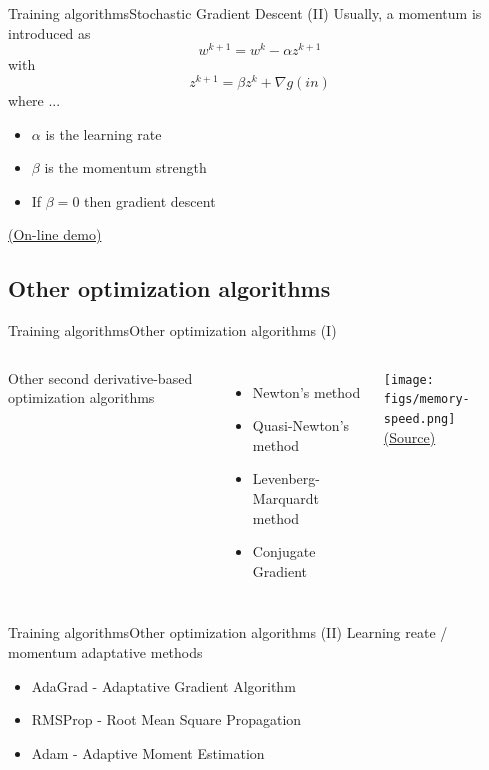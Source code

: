 \documentclass[10pt,compress]{beamer} %
\begin{document}
\begin{frame}{Training algorithms}{Stochastic Gradient Descent (II)}
    Usually, a \alert{momentum} is introduced as
	\begin{equation*}
	w^{k+1} = w^k - \alpha z^{k+1}
        \end{equation*}
with
	\begin{equation*}
	z^{k+1} = \beta z^k + \nabla g(in)
        \end{equation*}
    where ...
    \begin{itemize}
	\item $\alpha$ is the learning rate
	\item $\beta$ is the momentum strength
        \item If $\beta = 0$ then gradient descent
    \end{itemize}

    \href{http://distill.pub/2017/momentum/}{(On-line demo)}

\end{frame}

\subsection{Other optimization algorithms}
\begin{frame}{Training algorithms}{Other optimization algorithms (I)}
	\begin{columns}
		Other second derivative-based optimization algorithms
		\begin{itemize}
			\item Newton's method
			\item Quasi-Newton's method
			\item Levenberg-Marquardt method
			\item Conjugate Gradient
		\end{itemize}

		\begin{center}
			\texttt{[image: figs/memory-speed.png]}\\
			\scriptsize \href{https://www.neuraldesigner.com/blog/5_algorithms_to_train_a_neural_network}{(Source)}
		\end{center}
	\end{columns}
\end{frame}

\begin{frame}{Training algorithms}{Other optimization algorithms (II)}
	Learning reate / momentum  adaptative methods
	\begin{itemize}
		\item AdaGrad - Adaptative Gradient Algorithm
		\item RMSProp - Root Mean Square Propagation
		\item Adam - Adaptive Moment Estimation
	\end{itemize}
\end{frame}
\end{document}
